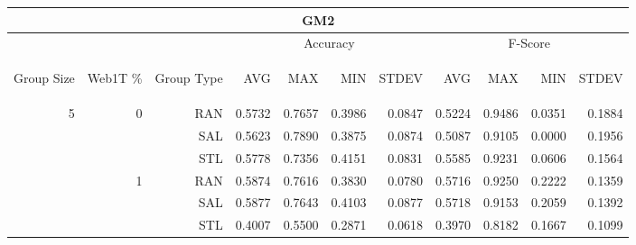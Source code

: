\begin{center}
\begin{table}[htbp]
\begin{tabular}{ | r | r | r | r | r | r | r | r | r | r | r |}
\hline
\multicolumn{11}{|c|}{GM2}\\
\hline
 & & & \multicolumn{4}{|c|}{Accuracy} & \multicolumn{4}{|c|}{F-Score}\\ \cline{4-11}
\begin{sideways}Group Size\end{sideways} & \begin{sideways}Web1T \%\end{sideways} & \begin{sideways}Group Type\end{sideways} & \begin{sideways}AVG\end{sideways} & \begin{sideways}MAX\end{sideways} & \begin{sideways}MIN\end{sideways} & \begin{sideways}STDEV\end{sideways} & \begin{sideways}AVG\end{sideways} & \begin{sideways}MAX\end{sideways} & \begin{sideways}MIN\end{sideways} & \begin{sideways}STDEV\end{sideways}\\
\hline
\multirow{18}{*}{5}
 & \multirow{3}{*}{0} & RAN & 0.5732 & 0.7657 & 0.3986 & 0.0847 & 0.5224 & 0.9486 & 0.0351 & 0.1884\\ \cline{3-11}
 &   & SAL & 0.5623 & 0.7890 & 0.3875 & 0.0874 & 0.5087 & 0.9105 & 0.0000 & 0.1956\\ \cline{3-11}
 &   & STL & 0.5778 & 0.7356 & 0.4151 & 0.0831 & 0.5585 & 0.9231 & 0.0606 & 0.1564\\ \cline{2-11}
 & \multirow{3}{*}{1} & RAN & 0.5874 & 0.7616 & 0.3830 & 0.0780 & 0.5716 & 0.9250 & 0.2222 & 0.1359\\ \cline{3-11}
 &   & SAL & 0.5877 & 0.7643 & 0.4103 & 0.0877 & 0.5718 & 0.9153 & 0.2059 & 0.1392\\ \cline{3-11}
 &   & STL & 0.4007 & 0.5500 & 0.2871 & 0.0618 & 0.3970 & 0.8182 & 0.1667 & 0.1099\\ \cline{2-11}

\end{tabular}
\end{table}
\end{center}
